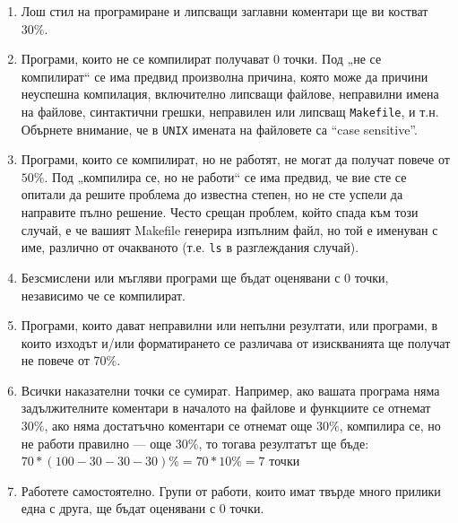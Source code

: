 \documentclass[a4paper,10pt]{article}
\begin{document}
\begin{enumerate}
\item Лош стил на програмиране и липсващи заглавни коментари ще ви костват $30\%$.

\item Програми, които не се компилират получават 0 точки. Под „не се компилират“ се има предвид произволна причина, която може да причини неуспешна компилация, включително липсващи файлове, неправилни имена на файлове, синтактични грешки, неправилен или липсващ  \lstinline{Makefile}, и т.н. Обърнете внимание, че в \lstinline{UNIX} имената на файловете са ``case sensitive''.

\item Програми, които се компилират, но не работят, не могат да получат повече от $50\%$. Под „компилира се, но не работи“ се има предвид, че вие сте се опитали да решите проблема до известна степен, но не сте успели да направите пълно решение. Често срещан проблем, който спада към този случай, е че вашият  Makefile генерира изпълним файл, но той е именуван с име, различно от очакваното (т.е. \lstinline{ls} в разглеждания случай).

\item Безсмислени или мъгляви програми ще бъдат оценявани с 0 точки, независимо че се компилират. 

\item Програми, които дават неправилни или непълни резултати, или програми, в които изходът и/или форматирането се различава от изискванията ще получат не повече от $70\%$.

\item Всички наказателни точки се сумират. Например, ако вашата програма няма задължителните коментари в началото на файлове и функциите се отнемат $30\%$, ако няма достатъчно коментари се отнемат още $30\%$, компилира се, но не работи правилно — още $30\%$, то тогава резултатът ще бъде: 
$70*(100-30-30-30)\%= 70*10\%= 7$ точки

\item Работете самостоятелно. Групи от работи, които имат твърде много прилики една с друга, ще бъдат оценявани с 0 точки.

\end{enumerate}
\end{document}
